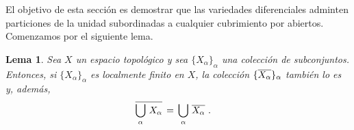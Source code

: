 \theoremstyle{plain}
\newtheorem{lemaLocFin}{Lema}[section]
\newtheorem{propoParticionesLCH}[lemaLocFin]{Proposici\'{o}n}
\newtheorem{propoParticionesSigmaCompLCH}[lemaLocFin]{Proposici\'{o}n}

\newtheorem{lemaParticionesEnRI}[lemaLocFin]{Lema}
\newtheorem{lemaParticionesEnRII}[lemaLocFin]{Lema}
\newtheorem{lemaParticionesEnRIII}[lemaLocFin]{Lema}

\newtheorem{coroParticionesVarTop}[lemaLocFin]{Corolario}
\newtheorem{propoParticionesVarDif}[lemaLocFin]{Proposici\'{o}n}

\newtheorem{propoHayChichones}[lemaLocFin]{Proposici\'{o}n}
\newtheorem{propoExtenderFuncionesSuaves}[lemaLocFin]{Proposici\'{o}n}
\newtheorem{coroExhaustiva}[lemaLocFin]{Corolario}

\theoremstyle{remark}


El objetivo de esta secci\'{o}n es demostrar que las variedades diferenciales
adminten particiones de la unidad subordinadas a cualquier cubrimiento por
abiertos. Comenzamos por el siguiente lema.

\begin{lemaLocFin}\label{thm:locfin}
	Sea $X$ un espacio topol\'{o}gico y sea $\{X_{\alpha}\}_{\alpha}$
	una colecci\'{o}n de subconjuntos. Entonces, si
	$\{X_{\alpha}\}_{\alpha}$ es localmente finito en $X$, la colecci\'{o}n
	$\{\overline{X_{\alpha}}\}_{\alpha}$ tambi\'{e}n lo es y, adem\'{a}s,
	\begin{align*}
		\overline{\bigcup_{\alpha}\,X_{\alpha}} & \,=\,
			\bigcup_{\alpha}\,\overline{X_{\alpha}}
		\text{ .}
	\end{align*}
\end{lemaLocFin}

